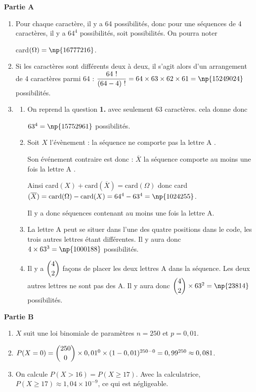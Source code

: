 \textbf{Partie A}

\medskip
\begin{enumerate}
	\item Pour chaque caractère, il y a 64 possibilités, donc pour une séquences de 4 caractères, il y a $64^4$ possibilités, soit  possibilités. On pourra noter 
	
card$(\Omega)=\np{16777216}$.
	\item Si les caractères sont différents deux à deux, il s'agit alors d'un arrangement de 4 caractères parmi 64 : $\dfrac{64~!}{(64-4)~!}=64 \times 63 \times 62 \times 61=\np{15249024}$ possibilités.
	\item 
	\begin{enumerate}
		\item On reprend la question \textbf{1.} avec seulement 63 caractères. cela donne donc

$63^4=\np{15752961}$ possibilités.
		\item Soit $X$ l'évènement : \og la séquence ne comporte pas la lettre A \fg.

Son événement contraire est donc : $\overline{X}$ \og la séquence comporte au moins une fois la lettre A \fg{}.

		Ainsi card$(X) + \text{card}(\overline{X})= \text{card}(\Omega)$ donc card$(\overline{X}) = \text{card}(\Omega) - \text{card}(X) = 64^4 - 63^4 = \np{1024255}$.

Il y a donc  séquences contenant au moins une fois la lettre A.
		\item La lettre A peut se situer dans l'une des quatre positions dans le code, les trois autres lettres étant différentes. Il y aura donc $4\times 63^3 = \np{1000188}$ possibilités.
		\item Il y a $\dbinom{4}{2}$ façons de placer les deux lettres A dans la séquence. Les deux autres lettres ne sont pas des A. Il y aura donc $\dbinom{4}{2} \times 63^2 = \np{23814}$ possibilités.
	\end{enumerate}
\end{enumerate}

\medskip

\textbf{Partie B}

\medskip

\begin{enumerate}
	\item $X$ suit une loi binomiale de paramètres $n=250$ et $p=0,01$.
	\item $P(X=0)=\dbinom{250}{0}\times 0,01^0\times (1-0,01)^{250-0}=0,99^{250}\approx 0,081$.
	\item On calcule $P(X >16)= P(X\geqslant 17)$. Avec la calculatrice, $P(X\geqslant 17)\approx 1,04\times 10^{-9}$, ce qui est négligeable.
\end{enumerate}

